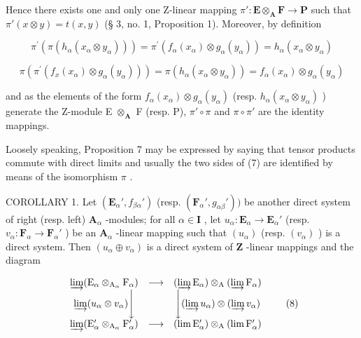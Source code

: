Hence there exists one and only one Z-linear mapping \(\pi':\mathbf{E} \otimes_{\mathbf{A}} \mathbf{F} \to \mathbf{P}\) such that \(\pi'(x \otimes y) = t(x, y)\) (§ 3, no. 1, Proposition 1). Moreover, by definition

\[
\pi^ {\prime} \left(\pi \left(h _ {\alpha} \left(x _ {\alpha} \otimes y _ {\alpha}\right)\right)\right) = \pi^ {\prime} \left(f _ {\alpha} \left(x _ {\alpha}\right) \otimes g _ {\alpha} \left(y _ {\alpha}\right)\right) = h _ {\alpha} \left(x _ {\alpha} \otimes y _ {\alpha}\right)
\]

\[
\pi (\pi^ {\prime} (f _ {x} (x _ {\alpha}) \otimes g _ {\alpha} (y _ {\alpha}))) = \pi (h _ {\alpha} (x _ {\alpha} \otimes y _ {\alpha})) = f _ {\alpha} (x _ {\alpha}) \otimes g _ {\alpha} (y _ {\alpha})
\]

and as the elements of the form \(f_{\alpha}(x_{\alpha}) \otimes g_{\alpha}(y_{\alpha})\) (resp. \(h_{\alpha}(x_{\alpha} \otimes y_{\alpha})\) ) generate the Z-module E \(\otimes_{\mathbf{A}}\) F (resp. P), \(\pi' \circ \pi\) and \(\pi \circ \pi'\) are the identity mappings.

Loosely speaking, Proposition 7 may be expressed by saying that tensor products commute with direct limits and usually the two sides of (7) are identified by means of the isomorphism \(\pi\) .

COROLLARY 1. Let \((\mathbf{E}_{\alpha}', f_{\beta \alpha}')\) (resp. \((\mathbf{F}_{\alpha}', g_{\alpha \beta}'))\) be another direct system of right (resp. left) \(\mathbf{A}_{\alpha}\) -modules; for all \(\alpha \in \mathbf{I}\) , let \(u_{\alpha}: \mathbf{E}_{\alpha} \to \mathbf{E}_{\alpha}'\) (resp. \(v_{\alpha}: \mathbf{F}_{\alpha} \to \mathbf{F}_{\alpha}'\) ) be an \(\mathbf{A}_{\alpha}\) -linear mapping such that \((u_{\alpha})\) (resp. \((v_{\alpha})\) ) is a direct system. Then \((u_{\alpha} \oplus v_{\alpha})\) is a direct system of \(\mathbf{Z}\) -linear mappings and the diagram

\[
\begin{array}{c c c} \varinjlim (\mathrm{E} _ {\alpha} \otimes_ {\mathrm{A} _ {\alpha}} \mathrm{F} _ {\alpha}) & \longrightarrow & (\varinjlim \mathrm{E} _ {\alpha}) \otimes_ {\mathrm{A}} (\varinjlim \mathrm{F} _ {\alpha}) \\ \varinjlim (u _ {\alpha} \otimes v _ {\alpha}) \Bigg \downarrow & & \Bigg \downarrow (\varinjlim u _ {\alpha}) \otimes (\varinjlim v _ {\alpha}) \\ \varinjlim (\mathrm{E} _ {\alpha} ^ {\prime} \otimes_ {\mathrm{A} _ {\alpha}} \mathrm{F} _ {\alpha} ^ {\prime}) & \longrightarrow & (\lim \mathrm{E} _ {\alpha} ^ {\prime}) \otimes_ {\mathrm{A}} (\lim \mathrm{F} _ {\alpha} ^ {\prime}) \end{array}\tag{8}
\]

